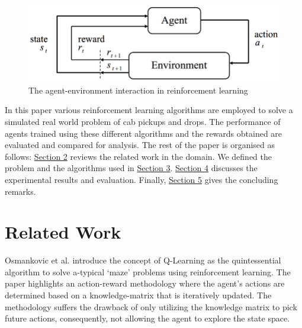 \documentclass{svproc}
\begin{document}

\begin{figure}[H]
\centering
\includegraphics[scale=0.25]{figures/agenv.png}
\caption{The agent-environment interaction in reinforcement learning}
\label{fig:ageenv}
\end{figure}
In this paper various reinforcement learning algorithms are employed to solve a simulated real world problem of cab pickups and drops. The performance of agents trained using these different algorithms and the rewards obtained are evaluated and compared for analysis. The rest of the paper is organised as follows: \hyperref[sec:2]{Section 2} reviews the related work in the domain. We defined the problem and the algorithms used in \hyperref[sec:3]{Section 3}. \hyperref[sec:4]{Section 4} discusses the experimental results and evaluation. Finally, \hyperref[sec:5]{Section 5} gives the concluding remarks.
 

\section{Related Work}
\label{sec:2}
Osmankovic et al. \cite{osmankovic2011implementation} introduce the concept of Q-Learning as the quintessential algorithm to solve a-typical ‘maze’ problems using reinforcement learning. The paper highlights an action-reward methodology where the agent’s actions are determined based on a knowledge-matrix that is iteratively updated. The methodology suffers the drawback of only utilizing the knowledge matrix to pick future actions, consequently, not allowing the agent to explore the state space.
\end{document}
